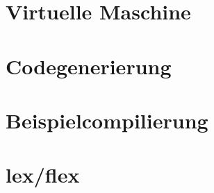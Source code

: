 \documentclass{scrreprt}
\begin{document}
\chapter{Virtuelle Maschine}


\chapter{Codegenerierung}


\chapter{Beispielcompilierung}


\chapter{lex/flex}

\end{document}
